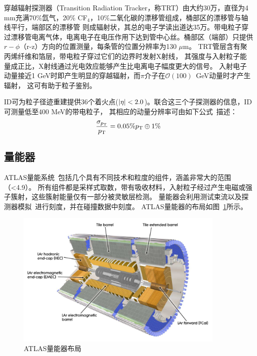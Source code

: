 穿越辐射探测器（Transition Radiation Tracker，称TRT）由大约30万，直径为4 mm充满70\%氙气，20\% CF$_4$，10\%二氧化碳的漂移管组成，桶部区的漂移管与轴线平行，端部区的漂移管
则成辐射状，其总的电子学读出道达35万。带电粒子穿过漂移管电离气体，电离电子在电压作用下达到管中心丝。桶部区（端部）只提供$r-\phi$（r-z）方向的位置测量，每条管的位置分辨率为130 $\mu\text{m}$。
TRT管层含有聚丙烯纤维和箔层，带电粒子穿过它们的边界时发射X射线，
其强度与入射粒子能量成正比，X射线通过光电效应能够产生比电离电子幅度更大的信号。
入射电子动量接近1 GeV时即产生明显的穿越辐射，而$\pi$介子在$\mathcal{O(100)}$~GeV动量时才产生辐射，
这可有助于粒子鉴别。

ID可为粒子径迹重建提供36个着火点($|\eta| < 2.0$)。联合这三个子探测器的信息，ID可测量\pt 低至400 MeV的带电粒子，
其相应的动量分辨率可由如下公式~\cite{ATLAS_Collaboration_2008}描述：
\begin{equation}
 \frac{\sigma_{p_{\text{T}}}}{p_{\text{T}}}=0.05\%p_{\text{T}}\oplus1\%
\end{equation}

\subsection{量能器}
ATLAS量能系统~\cite{ATLAS_Collaboration_2008}包括几个具有不同技术和粒度的组件，涵盖非常大的范围（\abseta <4.9）。 所有组件都是采样式取数，带有吸收材料，入射粒子经过产生电磁或强子簇射，这些簇射能量仅有一部分被灵敏层检测。 量能器会利用测试束流以及探测器模拟~\cite{4436305,Davidek_2009}进行刻度，并在碰撞数据中刻度。 
ATLAS量能器的布局如图~\ref{fig:Calorimeter_d3}所示。
\begin{figure}[h]
\begin{center}
\includegraphics[width=0.9\textwidth]{fig/Calorimeter_d3.pdf}
\caption{ATLAS量能器布局} \label{fig:Calorimeter_d3}
\end{center}
\end{figure}

